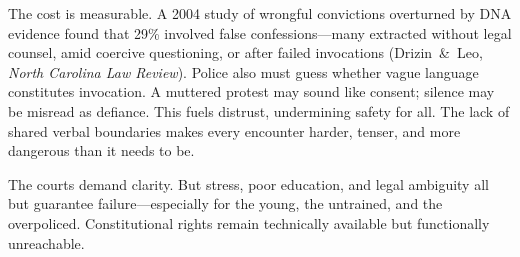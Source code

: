 The cost is measurable. A 2004 study of wrongful convictions overturned by DNA evidence found that 29\% involved false confessions—many extracted without legal counsel, amid coercive questioning, or after failed invocations (Drizin \& Leo, \emph{North Carolina Law Review}). Police also must guess whether vague language constitutes invocation. A muttered protest may sound like consent; silence may be misread as defiance. This fuels distrust, undermining safety for all. The lack of shared verbal boundaries makes every encounter harder, tenser, and more dangerous than it needs to be.

The courts demand clarity. But stress, poor education, and legal ambiguity all but guarantee failure—especially for the young, the untrained, and the overpoliced. Constitutional rights remain technically available but functionally unreachable.
